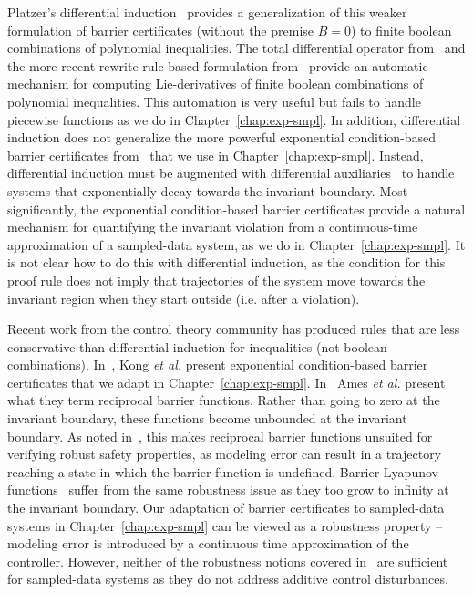 Platzer's differential induction~\cite{platzer2010logical,Platzer10DAL}
provides a generalization of this weaker formulation of barrier
certificates (without the premise $B = 0$) to finite boolean combinations
of polynomial inequalities. The total differential operator
from~\cite{platzer2010logical,Platzer10DAL} and the more recent rewrite
rule-based formulation from~\cite{Platzer15substitution} provide an
automatic mechanism for computing Lie-derivatives of finite boolean
combinations of polynomial inequalities. This automation is very useful but
fails to handle piecewise functions as we do in
Chapter~\ref{chap:exp-smpl}. In addition, differential induction does not
generalize the more powerful exponential condition-based barrier
certificates from~\cite{kong2013barrier} that we use in
Chapter~\ref{chap:exp-smpl}. Instead, differential induction must be
augmented with differential auxiliaries~\cite{Platzer12diffcut} to handle
systems that exponentially decay towards the invariant boundary. Most
significantly, the exponential condition-based barrier certificates provide
a natural mechanism for quantifying the invariant violation from a
continuous-time approximation of a sampled-data system, as we do in
Chapter~\ref{chap:exp-smpl}. It is not clear how to do this with
differential induction, as the condition for this proof rule does not imply
that trajectories of the system move towards the invariant region when they
start outside (i.e. after a violation).

Recent work from the control theory community has produced rules that are
less conservative than differential induction for inequalities (not boolean
combinations). In~\cite{kong2013barrier}, Kong \emph{et al.} present
exponential condition-based barrier certificates that we adapt in
Chapter~\ref{chap:exp-smpl}. In~\cite{ames2016control} Ames \emph{et al.}
present what they term reciprocal barrier functions. Rather than going to
zero at the invariant boundary, these functions become unbounded at the
invariant boundary. As noted in~\cite{xu15barrier}, this makes reciprocal
barrier functions unsuited for verifying robust safety properties, as
modeling error can result in a trajectory reaching a state in which the
barrier function is undefined. Barrier Lyapunov
functions~\cite{Tee09ctrlbarrier} suffer from the same robustness issue as
they too grow to infinity at the invariant boundary. Our adaptation of
barrier certificates to sampled-data systems in Chapter~\ref{chap:exp-smpl}
can be viewed as a robustness property -- modeling error is introduced by a
continuous time approximation of the controller. However, neither of the
robustness notions covered in~\cite{xu15barrier} are sufficient for
sampled-data systems as they do not address additive control disturbances.

